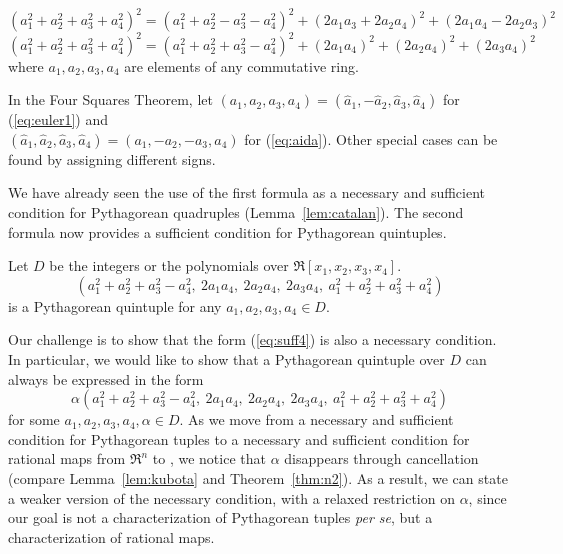 \begin{lemma}[Euler]
\label{lem:corEuler4square}
\ \ \\
\begin{equation}
\label{eq:euler1}
(a_1^2 + a_2^2 + a_3^2 + a_4^2)^2 = 
(a_1^2 + a_2^2 - a_3^2 - a_4^2)^2 + (2a_1a_3+2a_2a_4)^2 + (2a_1a_4-2a_2a_3)^2
\end{equation}
%
\begin{equation}
\label{eq:aida}
(a_1^2 + a_2^2 + a_3^2 + a_4^2)^2 = 
(a_1^2 + a_2^2 + a_3^2 - a_4^2)^2 + (2a_1a_4)^2 + (2a_2a_4)^2 + (2a_3a_4)^2
\end{equation}
where $a_1,a_2,a_3,a_4$ are elements of any commutative ring.
\end{lemma}
\prf
In the Four Squares Theorem, let 
$(a_1,a_2,a_3,a_4) = (\hat{a}_1,-\hat{a}_2,\hat{a}_3,\hat{a}_4)$
for (\ref{eq:euler1}) and \\
$(\hat{a}_1,\hat{a}_2,\hat{a}_3,\hat{a}_4) = (a_1,-a_2,-a_3,a_4)$ 
for (\ref{eq:aida}).
Other special cases can be found by assigning different signs.
\QED

We have already seen the use of the first formula as a necessary and
sufficient condition for Pythagorean quadruples (Lemma~\ref{lem:catalan}).
The second formula now provides a sufficient condition for Pythagorean quintuples.

\begin{lemma}
\label{lem:suff4}
Let $D$ be the integers or the polynomials over $\Re[x_1,x_2,x_3,x_4]$.
\begin{equation}
\label{eq:suff4}
	(a_1^2 + a_2^2 + a_3^2 - a_4^2,\ 2a_1a_4,\ 2a_2a_4,\ 2a_3a_4,\ 
	 a_1^2 + a_2^2 + a_3^2 + a_4^2)
\end{equation}
is a Pythagorean quintuple for any $a_1,a_2,a_3,a_4 \in D$.
\end{lemma}

Our challenge is to show that the form (\ref{eq:suff4}) is also a necessary condition.
In particular, we would like to show that a Pythagorean quintuple over $D$ 
can always be expressed in the form  
\begin{equation}
\label{eq:alphasuff4}
	\alpha (a_1^2 + a_2^2 + a_3^2 - a_4^2,\ 2a_1a_4,\ 2a_2a_4,\ 2a_3a_4,\ 
	 a_1^2 + a_2^2 + a_3^2 + a_4^2)
\end{equation}
for some $a_1,a_2,a_3,a_4,\alpha \in D$.
As we move from a necessary and sufficient condition for Pythagorean tuples 
to a necessary and sufficient condition for rational maps from $\Re^n$ to 
\Sn{n-1}, we notice that $\alpha$ disappears through cancellation 
(compare Lemma~\ref{lem:kubota} and Theorem~\ref{thm:n2}).
As a result, we can state a weaker version of the necessary condition,
with a relaxed restriction on $\alpha$,
since our goal is not a characterization of Pythagorean tuples {\em per se},
but a characterization of rational maps.

